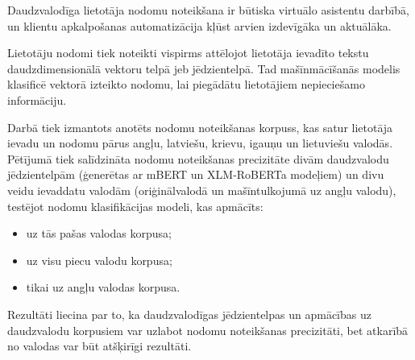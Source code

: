 Daudzvalodīga lietotāja nodomu noteikšana ir būtiska virtuālo asistentu darbībā, un klientu apkalpošanas automatizācija kļūst arvien izdevīgāka un aktuālāka. 

Lietotāju nodomi tiek noteikti vispirms attēlojot lietotāja ievadīto tekstu daudzdimensionālā vektoru telpā jeb jēdzientelpā. Tad mašīnmācīšanās modelis klasificē vektorā izteikto nodomu, lai piegādātu lietotājiem nepieciešamo informāciju.

Darbā tiek izmantots anotēts nodomu noteikšanas korpuss, kas satur lietotāja ievadu un nodomu pārus angļu, latviešu, krievu, igauņu un lietuviešu valodās. Pētījumā tiek salīdzināta nodomu noteikšanas precizitāte divām daudzvalodu jēdzientelpām (ģenerētas ar mBERT un XLM-RoBERTa modeļiem) un divu veidu ievaddatu valodām (oriģinālvalodā un mašīntulkojumā uz angļu valodu), testējot nodomu klasifikācijas modeli, kas apmācīts:
\begin{itemize}
    \item uz tās pašas valodas korpusa;
    \item uz visu piecu valodu korpusa;
    \item tikai uz angļu valodas korpusa.
\end{itemize}

Rezultāti liecina par to, ka daudzvalodīgas jēdzientelpas un apmācības uz daudzvalodu korpusiem var uzlabot nodomu noteikšanas precizitāti, bet atkarībā no valodas var būt atšķirīgi rezultāti.

